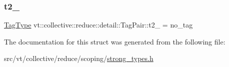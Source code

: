 \subsubsection{\texorpdfstring{t2\+\_\+}{t2\_}}
{\footnotesize\ttfamily \hyperlink{namespacevt_a84ab281dae04a52a4b243d6bf62d0e52}{Tag\+Type} vt\+::collective\+::reduce\+::detail\+::\+Tag\+Pair\+::t2\+\_\+ = no\+\_\+tag\hspace{0.3cm}{\ttfamily [private]}}



The documentation for this struct was generated from the following file\+:\begin{DoxyCompactItemize}
\item 
src/vt/collective/reduce/scoping/\hyperlink{strong__types_8h}{strong\+\_\+types.\+h}\end{DoxyCompactItemize}
